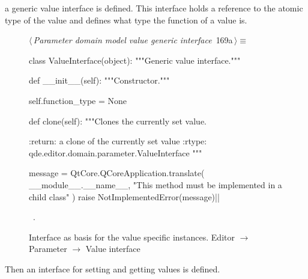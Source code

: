 \documentclass[%
    a4paper,    %
    justified,  %
    nobib,      %
    openany     %
]{tufte-book}
\makeatletter
\renewcommand{\label}[1]{\@tufte@label{##1}}%
\makeatother
\begin{document}
 a generic value interface is
defined. This interface holds a reference to the atomic type of the value and
defines what type the function of a value is.

\begin{figure}[!htbp]
\begin{flushleft} \small
\begin{minipage}{\linewidth}\label{scrap136}\raggedright\small
{} $\langle\,${\itshape Parameter domain model value generic interface}\nobreak\ {\footnotesize {169a}}$\,\rangle\equiv$
\vspace{-1ex}
\begin{pythoncode}
class ValueInterface(object):
    """Generic value interface."""

    def __init__(self):
        """Constructor."""

        self.function_type = None

    def clone(self):
        """Clones the currently set value.

        :return: a clone of the currently set value
        :rtype:  qde.editor.domain.parameter.ValueInterface
        """

        message = QtCore.QCoreApplication.translate(
            __module__.__name__,
            "This method must be implemented in a child class"
        )
        raise NotImplementedError(message)|\NWsep|
\end{pythoncode}
\vspace{1.5ex}
\footnotesize
\begin{list}{}{\setlength{\itemsep}{-\parsep}\setlength{\itemindent}{-\leftmargin}}
\item \NWtxtMacroRefIn\ .

\item{}
\end{list}
\end{minipage}\vspace{4ex}
\end{flushleft}
\caption{Interface as basis for the value specific instances.
  \newline{}\newline{}Editor $\rightarrow$ Parameter $\rightarrow$
  Value interface}
\end{figure}

Then an interface for setting and getting values is defined.
\end{document}

